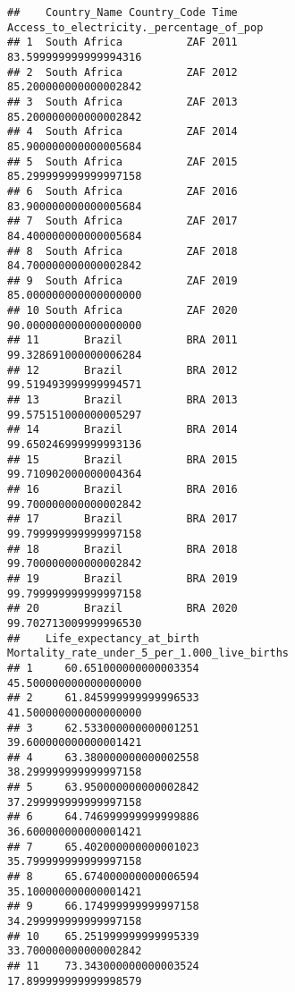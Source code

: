 \documentclass[
]{article}
\begin{document}
\begin{verbatim}
##    Country_Name Country_Code Time Access_to_electricity._percentage_of_pop
## 1  South Africa          ZAF 2011                    83.599999999999994316
## 2  South Africa          ZAF 2012                    85.200000000000002842
## 3  South Africa          ZAF 2013                    85.200000000000002842
## 4  South Africa          ZAF 2014                    85.900000000000005684
## 5  South Africa          ZAF 2015                    85.299999999999997158
## 6  South Africa          ZAF 2016                    83.900000000000005684
## 7  South Africa          ZAF 2017                    84.400000000000005684
## 8  South Africa          ZAF 2018                    84.700000000000002842
## 9  South Africa          ZAF 2019                    85.000000000000000000
## 10 South Africa          ZAF 2020                    90.000000000000000000
## 11       Brazil          BRA 2011                    99.328691000000006284
## 12       Brazil          BRA 2012                    99.519493999999994571
## 13       Brazil          BRA 2013                    99.575151000000005297
## 14       Brazil          BRA 2014                    99.650246999999993136
## 15       Brazil          BRA 2015                    99.710902000000004364
## 16       Brazil          BRA 2016                    99.700000000000002842
## 17       Brazil          BRA 2017                    99.799999999999997158
## 18       Brazil          BRA 2018                    99.700000000000002842
## 19       Brazil          BRA 2019                    99.799999999999997158
## 20       Brazil          BRA 2020                    99.702713009999996530
##    Life_expectancy_at_birth Mortality_rate_under_5_per_1.000_live_births
## 1     60.651000000000003354                        45.500000000000000000
## 2     61.845999999999996533                        41.500000000000000000
## 3     62.533000000000001251                        39.600000000000001421
## 4     63.380000000000002558                        38.299999999999997158
## 5     63.950000000000002842                        37.299999999999997158
## 6     64.746999999999999886                        36.600000000000001421
## 7     65.402000000000001023                        35.799999999999997158
## 8     65.674000000000006594                        35.100000000000001421
## 9     66.174999999999997158                        34.299999999999997158
## 10    65.251999999999995339                        33.700000000000002842
## 11    73.343000000000003524                        17.899999999999998579

\end{verbatim}
\end{document}
